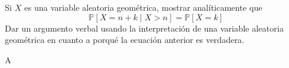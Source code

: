 	\question
		Si $X$ es una variable aleatoria geométrica, mostrar analíticamente que
		\begin{equation*}
			\mathds{P}[X=n+k\mid X>n]=\mathds{P}[X=k]
		\end{equation*}
		Dar un argumento verbal usando la interpretación de una variable aleatoria geométrica en cuanto a porqué la ecuación anterior es verdadera.
	\begin{solutionorbox}
		A
	\end{solutionorbox}